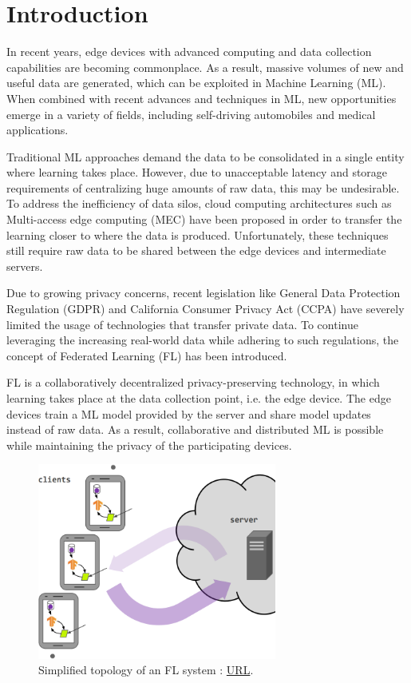 \chapter{Introduction}
\label{Chapter-Introduction}
In recent years, edge devices with advanced computing and data collection capabilities are becoming commonplace. As a result, massive volumes of new and useful data are generated, which can be exploited in Machine Learning (ML). When combined with recent advances and techniques in ML, new opportunities emerge in a variety of fields, including self-driving automobiles and medical applications. 

Traditional ML approaches demand the data to be consolidated in a single entity where learning takes place. However, due to unacceptable latency and storage requirements of centralizing huge amounts of raw data, this may be undesirable. To address the inefficiency of data silos, cloud computing architectures such as Multi-access edge computing (MEC) \cite{MEC} have been proposed in order to transfer the learning closer to where the data is produced. Unfortunately, these techniques still require raw data to be shared between the edge devices and intermediate servers.

Due to growing privacy concerns, recent legislation like General Data Protection Regulation (GDPR) \cite{GDPR} and California Consumer Privacy Act (CCPA) \cite{CCPA} have severely limited the usage of technologies that transfer private data. To continue leveraging the increasing real-world data while adhering to such regulations, the concept of Federated Learning (FL) \cite{FL-original-paper} has been introduced.

FL is a collaboratively decentralized privacy-preserving technology, in which learning takes place at the data collection point, i.e. the edge device. The edge devices train a ML model provided by the server and share model updates instead of raw data. As a result, collaborative and distributed ML is possible while maintaining the privacy of the participating devices.
\begin{figure}[H]
    \centering
        \includegraphics[width=0.7\textwidth]{Images/diagrams/FL_simplified.png}
        \decoRule
        \caption[FL system, simplified topology]{Simplified topology of an FL system \cite{survey_B}: \href{https://arxiv.org/abs/1912.04977}{URL}.}
        \label{fig: FL simplified topology}
\end{figure}

